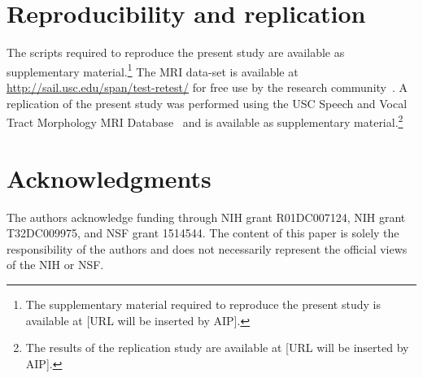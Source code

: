 \documentclass[reprint]{JASAnew}\usepackage[]{graphicx}\usepackage[]{color}
\begin{document}
\section{Reproducibility and replication}

The scripts required to reproduce the present study are available as supplementary material.\footnote{The supplementary material required to reproduce the present study is available at [URL will be inserted by AIP].}
%
The MRI data-set is available at \url{http://sail.usc.edu/span/test-retest/} for free use by the research community~\citep[see][]{toger2017test}.
%
A replication of the present study was performed using the USC Speech and Vocal Tract Morphology MRI Database~\citep{sorensen2017database} and is available as supplementary material.\footnote{The results of the replication study are available at [URL will be inserted by AIP].}

\section{Acknowledgments} 

The authors acknowledge funding through NIH grant R01DC007124, NIH grant T32DC009975, and NSF grant 1514544. The content of this paper is solely the responsibility of the authors and does not necessarily represent the official views of the NIH or NSF.


\end{document}
